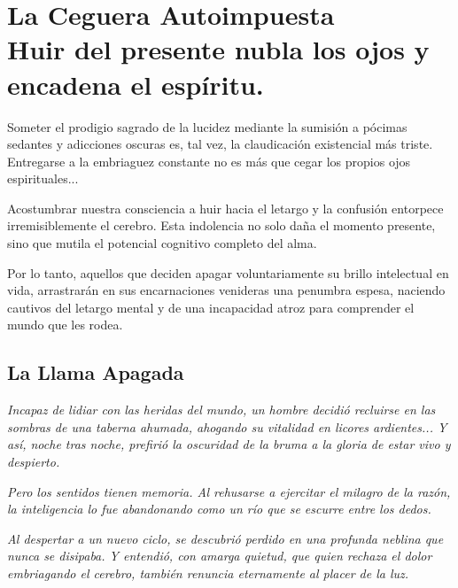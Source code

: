\chapter[La Ceguera Autoimpuesta]{La Ceguera Autoimpuesta\\ \large Huir del presente nubla los ojos y encadena el espíritu.}


\lettrine[lines=3, nindent=0.5em, findent=0.2em]{S}{}ometer el prodigio sagrado de la lucidez mediante la sumisión a pócimas sedantes y adicciones oscuras es, tal vez, la claudicación existencial más triste. Entregarse a la embriaguez constante no es más que cegar los propios ojos espirituales...

Acostumbrar nuestra consciencia a huir hacia el letargo y la confusión entorpece irremisiblemente el cerebro. Esta indolencia no solo daña el momento presente, sino que mutila el potencial cognitivo completo del alma.

Por lo tanto, aquellos que deciden apagar voluntariamente su brillo intelectual en vida, arrastrarán en sus encarnaciones venideras una penumbra espesa, naciendo cautivos del letargo mental y de una incapacidad atroz para comprender el mundo que les rodea.

\section{La Llama Apagada}
\begin{elegantquote}
\textit{Incapaz de lidiar con las heridas del mundo, un hombre decidió recluirse en las sombras de una taberna ahumada, ahogando su vitalidad en licores ardientes... Y así, noche tras noche, prefirió la oscuridad de la bruma a la gloria de estar vivo y despierto.}

\textit{Pero los sentidos tienen memoria. Al rehusarse a ejercitar el milagro de la razón, la inteligencia lo fue abandonando como un río que se escurre entre los dedos.}

\textit{Al despertar a un nuevo ciclo, se descubrió perdido en una profunda neblina que nunca se disipaba. Y entendió, con amarga quietud, que quien rechaza el dolor embriagando el cerebro, también renuncia eternamente al placer de la luz.}

\end{elegantquote}


